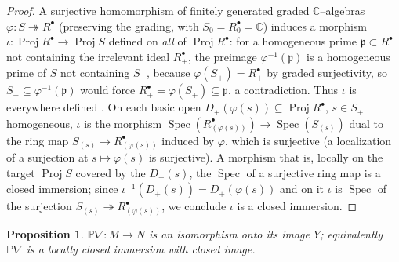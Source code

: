 \documentclass{amsart}
\newtheorem{proposition}{Proposition}
\theoremstyle{definition}
\DeclareMathOperator{\Spec}{Spec}
\DeclareMathOperator{\Proj}{Proj}
\newcommand{\PP}{\mathbb{P}}
\newcommand{\CC}{\mathbb{C}}
\newcommand{\nab}{\nabla}
\begin{document}
\begin{proof}
A surjective homomorphism of finitely generated graded $\CC$--algebras
$\varphi\colon S\twoheadrightarrow R^{\bullet}$ (preserving the grading, with
$S_0=R^{\bullet}_0=\CC$) induces a morphism $\iota\colon\Proj R^{\bullet}\to\Proj S$ defined
on \emph{all} of $\Proj R^{\bullet}$: for a homogeneous prime $\mathfrak p\subset R^{\bullet}$
not containing the irrelevant ideal $R^{\bullet}_{+}$, the preimage
$\varphi^{-1}(\mathfrak p)$ is a homogeneous prime of $S$ not containing $S_{+}$, because
$\varphi(S_{+})=R^{\bullet}_{+}$ by graded surjectivity, so $S_{+}\subseteq
\varphi^{-1}(\mathfrak p)$ would force $R^{\bullet}_{+}=\varphi(S_+)\subseteq\mathfrak p$, a
contradiction. Thus $\iota$ is everywhere defined \cite[Ch.~II, Ex.~2.14 and the discussion of
$\Proj$ functoriality for surjections]{Hartshorne}. On each basic open
$D_{+}(\varphi(s))\subseteq\Proj R^{\bullet}$, $s\in S_{+}$ homogeneous, $\iota$ is the
morphism $\Spec(R^{\bullet}_{(\varphi(s))})\to\Spec(S_{(s)})$ dual to the ring map
$S_{(s)}\to R^{\bullet}_{(\varphi(s))}$ induced by $\varphi$, which is surjective (a
localization of a surjection at $s\mapsto\varphi(s)$ is surjective). A morphism that is,
locally on the target $\Proj S$ covered by the $D_{+}(s)$, the $\Spec$ of a surjective ring
map is a closed immersion; since $\iota^{-1}(D_{+}(s))=D_{+}(\varphi(s))$ and on it $\iota$ is
$\Spec$ of the surjection $S_{(s)}\twoheadrightarrow R^{\bullet}_{(\varphi(s))}$, we conclude
$\iota$ is a closed immersion.
\end{proof}

\begin{proposition}\label{prop:iso-onto-image}
$\PP\nab\colon M\to N$ is an isomorphism onto its image $Y$; equivalently $\PP\nab$ is a
locally closed immersion with closed image.
\end{proposition}
\end{document}
